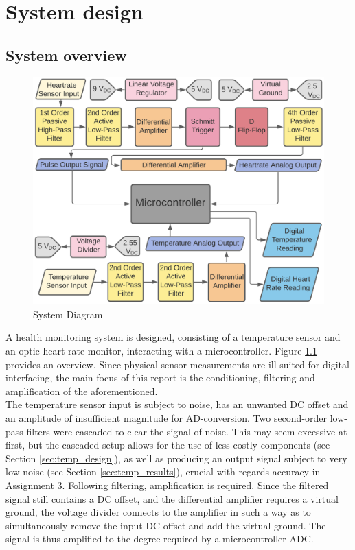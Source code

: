 
\chapter{System design}
	\section{System overview} \label{sec:system}

\begin{figure}[h]
    \centering
    \vspace{-0.5cm}
    \includegraphics[width = 1\textwidth]{Figures/overview}
    \caption{System Diagram}
    \label{fig:overview}
\end{figure}

A health monitoring system is designed, consisting of a temperature sensor and an optic heart-rate monitor, interacting with a microcontroller. Figure \ref{fig:overview} provides an overview. Since physical sensor measurements are ill-suited for digital interfacing, the main focus of this report is the conditioning, filtering and amplification of the aforementioned.\\

The temperature sensor input is subject to noise, has an unwanted DC offset and an amplitude of insufficient magnitude for AD-conversion. Two second-order low-pass filters were cascaded to clear the signal of noise. This may seem excessive at first, but the cascaded setup allows for the use of less costly components (see Section \ref{sec:temp_design}), as well as producing an output signal subject to very low noise (see Section \ref{sec:temp_results}), crucial with regards accuracy in Assignment 3. Following filtering, amplification is required. Since the filtered signal still contains a DC offset, and the differential amplifier requires a virtual ground, the voltage divider connects to the amplifier in such a way as to simultaneously remove the input DC offset and add the virtual ground. The signal is thus amplified to the degree required by a microcontroller ADC.\\

